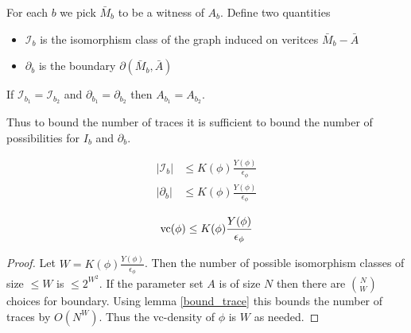 \documentclass{amsart}
\newcommand{\II}{\mathscr I}
\begin{document}
\begin{Definition}
	For each $b$ we pick $\bar M_b$ to be a witness of $A_b$. Define two quantities
	\begin{itemize}
		\item $\II_b$ is the isomorphism class of the graph induced on veritces $\bar M_b - \bar A$ %
		\item $\partial_b$ is the boundary $\partial(\bar M_b, \bar A)$
	\end{itemize}
\end{Definition}

\begin{Lemma} \label {bound_trace}
	If $\II_{b_1} = \II_{b_2}$ and $\partial_{b_1} = \partial_{b_2}$ then $A_{b_1} = A_{b_2}$.
\end{Lemma}

Thus to bound the number of traces it is sufficient to bound the number of possibilities for $I_b$ and $\partial_b$.

\begin{Theorem} \label{main_bound}
	\begin{align*}
		|\II_b| &\leq K(\phi) \frac{Y(\phi)}{\epsilon_\phi}\\
		|\partial_b| &\leq K(\phi) \frac{Y(\phi)}{\epsilon_\phi}
	\end{align*}
\end{Theorem}

\begin{Corollary}
	\begin{align*}
		\operatorname{vc}(\phi) \leq K(\phi) \frac{Y(\phi)}{\epsilon_\phi}
	\end{align*}
\end{Corollary}

\begin{proof}
		Let $W = K(\phi) \frac{Y(\phi)}{\epsilon_\phi}$.
		Then the number of possible isomorphism classes of size $\leq W$ is $\leq 2^{W^2}$.
		If the parameter set $A$ is of size $N$ then there are $N \choose W$ choices for boundary.
		Using lemma \ref{bound_trace} this bounds the number of traces by $O(N^W)$.
		Thus the vc-density of $\phi$ is $W$ as needed.
\end{proof}
\end{document}
